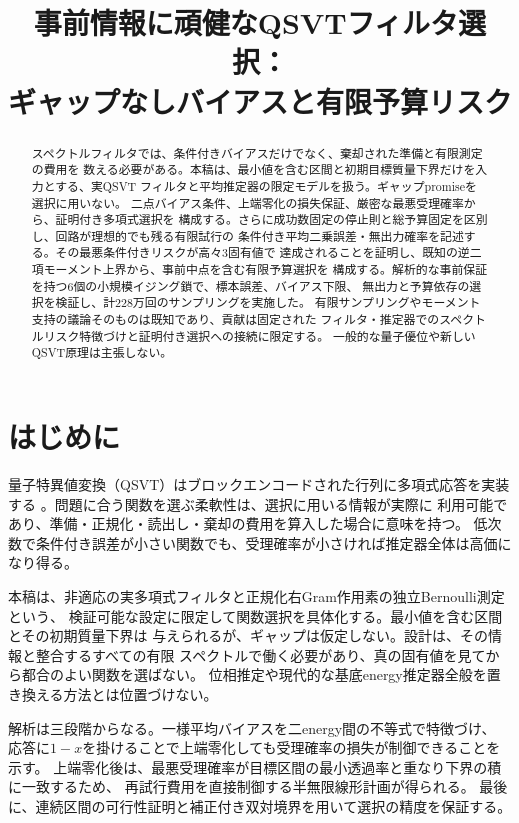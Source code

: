 \documentclass[11pt,a4paper]{article}
\title{事前情報に頑健なQSVTフィルタ選択：\\ギャップなしバイアスと有限予算リスク}
\author{}
\date{}
\begin{document}
\maketitle
\begin{abstract}
スペクトルフィルタでは、条件付きバイアスだけでなく、棄却された準備と有限測定の費用を
数える必要がある。本稿は、最小値を含む区間と初期目標質量下界だけを入力とする、実QSVT
フィルタと平均推定器の限定モデルを扱う。ギャップpromiseを選択に用いない。
二点バイアス条件、上端零化の損失保証、厳密な最悪受理確率から、証明付き多項式選択を
構成する。さらに成功数固定の停止則と総予算固定を区別し、回路が理想的でも残る有限試行の
条件付き平均二乗誤差・無出力確率を記述する。その最悪条件付きリスクが高々3固有値で
達成されることを証明し、既知の逆二項モーメント上界から、事前中点を含む有限予算選択を
構成する。解析的な事前保証を持つ6個の小規模イジング鎖で、標本誤差、バイアス下限、
無出力と予算依存の選択を検証し、計228万回のサンプリングを実施した。
有限サンプリングやモーメント支持の議論そのものは既知であり、貢献は固定された
フィルタ・推定器でのスペクトルリスク特徴づけと証明付き選択への接続に限定する。
一般的な量子優位や新しいQSVT原理は主張しない。
\end{abstract}

\section{はじめに}
量子特異値変換（QSVT）はブロックエンコードされた行列に多項式応答を実装する
\cite{Gilyen,Martyn}。問題に合う関数を選ぶ柔軟性は、選択に用いる情報が実際に
利用可能であり、準備・正規化・読出し・棄却の費用を算入した場合に意味を持つ。
低次数で条件付き誤差が小さい関数でも、受理確率が小さければ推定器全体は高価になり得る。

本稿は、非適応の実多項式フィルタと正規化右Gram作用素の独立Bernoulli測定という、
検証可能な設定に限定して関数選択を具体化する。最小値を含む区間とその初期質量下界は
与えられるが、ギャップは仮定しない。設計は、その情報と整合するすべての有限
スペクトルで働く必要があり、真の固有値を見てから都合のよい関数を選ばない。
位相推定や現代的な基底energy推定器全般を置き換える方法とは位置づけない。

解析は三段階からなる。一様平均バイアスを二energy間の不等式で特徴づけ、
応答に$1-x$を掛けることで上端零化しても受理確率の損失が制御できることを示す。
上端零化後は、最悪受理確率が目標区間の最小透過率と重なり下界の積に一致するため、
再試行費用を直接制御する半無限線形計画が得られる。
最後に、連続区間の可行性証明と補正付き双対境界を用いて選択の精度を保証する。
\end{document}
